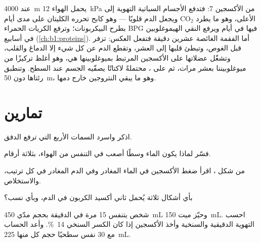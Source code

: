 \begin{example}\label{ex:b1:gas-exchange:altitudediving}
عند \qty{4000}{m} يحمل الهواء \qty{12}{kPa} من الأكسجين 
\qty{7}{}: فتدفع الأجسام السباتية التهوية إلى الأعلى، وهو ما يطرد
$\mathrm{CO_2}$ ويجعل الدم قلويًا --- وهو كابح تحرره الكليتان على
مدى أيام بطرح البيكربونات؛ وترفع الكريات الحمراء BPG فيها في أيام
ويرفع النقي الهيموغلوبين في أسابيع
(\cref{ch:b1:proteins}). أما الفقمة الغائصة عشرين دقيقة فتفعل
العكس: تزفر قبل الغوص، وتبطئ قلبها إلى العشر، وتقطع الدم عن كل شيء
إلا الدماغ والقلب، وتشغّل عضلاتها على الأكسجين المرتبط بميوغلوبينها
هي، وهو أغلظ تركيزًا من ميوغلوبيننا بعشر مرات، ثم على ،
محتملةً لاكتاتًا يصفّيه الجسم عند السطح. وتنطبق رئتاها دون
\qty{50}{m}، وهو ما يبقي النتروجين خارج دمها.
\end{example}

\section{تمارين}

\begin{exercise}[$\star$]\label{exo:b1:gas-exchange:1}
اذكر   واسرد السمات الأربع التي ترفع الدفق.
\end{exercise}

\begin{exercise}[$\star$]\label{exo:b1:gas-exchange:2}
فسّر لماذا يكون الماء وسطًا أصعب في التنفس من الهواء، بثلاثة
أرقام.
\end{exercise}

\begin{exercise}[$\star$]\label{exo:b1:gas-exchange:3}
من شكل ، اقرأ ضغط الأكسجين في الماء المغادر وفي الدم
المغادر في كل ترتيب، والاستخلاص.
\end{exercise}

\begin{exercise}[$\star$]\label{exo:b1:gas-exchange:4}
بأي أشكال ثلاثة يُحمل ثاني أكسيد الكربون في الدم، وبأي نسب؟
\end{exercise}

\begin{exercise}[$\star\star$]\label{exo:b1:gas-exchange:5}
شخص يتنفس \qty{15}{} مرة في الدقيقة بحجم مدّي \qty{450}{mL} وحيّز
ميت \qty{150}{mL}. احسب التهوية الدقيقية والسنخية وأخذ الأكسجين
إذا كان الكسر السنخي \qty{14}{\%}. وأعد الحساب مع \qty{30}{} نفس
سطحيًا حجم كل منها \qty{225}{mL}.
\end{exercise}

